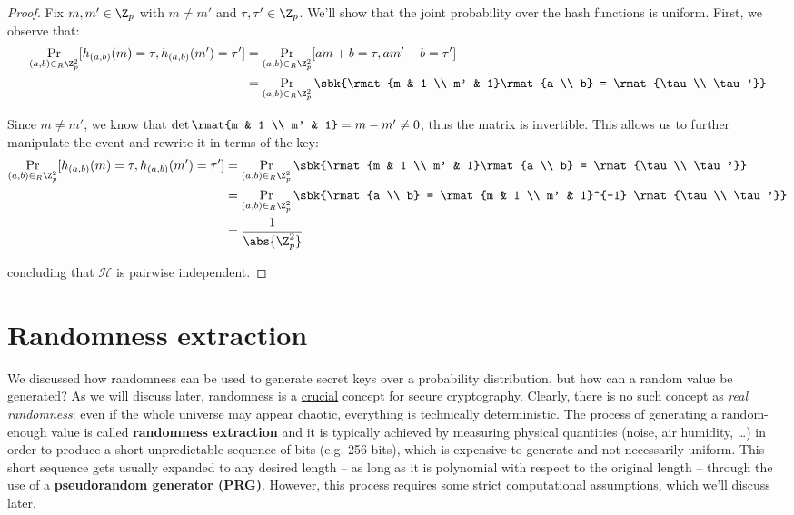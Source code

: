 \documentclass[a4paper, 12pt]{report}
\begin{document}
    \begin{proof}
        Fix $m, m' \in \Z_p$ with $m \neq m'$ and $\tau, \tau' \in \Z_p$. We'll show that the joint probability over the hash functions is uniform. First, we observe that:
        \[\begin{split}
            \Pr_{(a,b) \in_R \Z_p^2}[h_{(a,b)}(m) = \tau, h_{(a,b)}(m') = \tau']
            &= \Pr_{(a,b) \in_R \Z_p^2}[am+b = \tau, am' + b = \tau'] \\
            &= \Pr_{(a,b) \in_R \Z_p^2}\sbk{\rmat{m & 1 \\ m' & 1}\rmat{a \\ b} = \rmat{\tau \\ \tau'}}
        \end{split}\]

        Since $m \neq m'$, we know that $\det\rmat{m & 1 \\ m' & 1} = m-m' \neq 0$, thus the matrix is invertible. This allows us to further manipulate the event and rewrite it in terms of the key:
        \[\begin{split}
            \Pr_{(a,b) \in_R \Z_p^2}[h_{(a,b)}(m) = \tau, h_{(a,b)}(m') = \tau']
            &= \Pr_{(a,b) \in_R \Z_p^2}\sbk{\rmat{m & 1 \\ m' & 1}\rmat{a \\ b} = \rmat{\tau \\ \tau'}} \\
            &= \Pr_{(a,b) \in_R \Z_p^2}\sbk{\rmat{a \\ b} = \rmat{m & 1 \\ m' & 1}^{-1} \rmat{\tau \\ \tau'}} \\
            &= \frac{1}{\abs{\Z_p^2}}
        \end{split}\]

        concluding that $\mathcal{H}$ is pairwise independent.
    \end{proof}

    \section{Randomness extraction}

    We discussed how randomness can be used to generate secret keys over a probability distribution, but how can a random value be generated? As we will discuss later, randomness is a \underline{crucial} concept for secure cryptography. Clearly, there is no such concept as \textit{real randomness}: even if the whole universe may appear chaotic, everything is technically deterministic. The process of generating a random-enough value is called \textbf{randomness extraction} and it is typically achieved by measuring physical quantities (noise, air humidity, \dots) in order to produce a short unpredictable sequence of bits (e.g. 256 bits), which is expensive to generate and not necessarily uniform. This short  sequence gets usually expanded to any desired length -- as long as it is polynomial with respect to the original length -- through the use of a \textbf{pseudorandom generator (PRG)}. However, this process requires some strict computational assumptions, which we'll discuss later.
    
\end{document}
